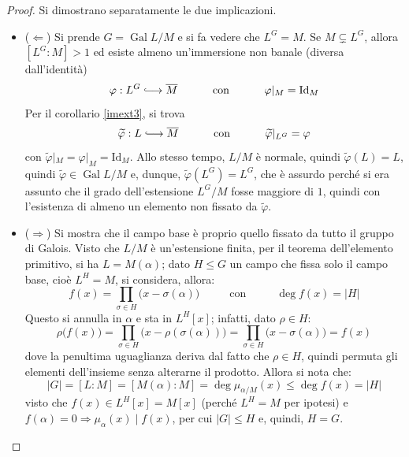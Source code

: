 \documentclass[12pt]{scrartcl}
\theoremstyle{style}
\numberwithin{equation}{subsection}
\newcommand{\longhookrightarrow}{\lhook\joinrel\longrightarrow}
\begin{document}
\begin{proof}
	Si dimostrano separatamente le due implicazioni.
	\begin{itemize}
		\item ($\Leftarrow$) Si prende $G = \operatorname{Gal} L / M$ e si fa vedere che $L^G = M$.
			Se $M \subsetneq L^G$, allora $[L^G:M] > 1$ ed esiste almeno un'immersione non banale (diversa dall'identit\`a)
			\[
			\varphi :L^G \longhookrightarrow \overline{M} \hspace{1cm} \text{ con }\hspace{1cm} \varphi |_M = \mathrm{Id} _M
			\] 
			Per il corollario \ref{imext3}, si trova
			\[
			\widetilde{\varphi }:L\longhookrightarrow \overline{M}\hspace{1cm} \text{ con }\hspace{1cm} \widetilde{\varphi }|_{L^G} =\varphi 
			\] 
			con $\widetilde{\varphi }|_M = \varphi |_M = \mathrm{Id} _M$.
			Allo stesso tempo, $L / M$ \`e normale, quindi $\widetilde{\varphi} (L) = L$, quindi $\widetilde{\varphi }\in \operatorname{Gal} L / M$ e, dunque, $\widetilde{\varphi }(L^G) = L^G$, che \`e assurdo perch\'e si era assunto che il grado dell'estensione $L^G / M$ fosse maggiore di $1$, quindi con l'esistenza di almeno un elemento non fissato da $\widetilde{\varphi }$.
		\item ($\Rightarrow $) Si mostra che il campo base \`e proprio quello fissato da tutto il gruppo di Galois.
			Visto che $L / M$ \`e un'estensione finita, per il teorema dell'elemento primitivo, si ha $L = M(\alpha )$; dato $H\le G$ un campo che fissa solo il campo base, cio\`e $L^H = M$, si considera, allora:
			\[
			f(x) = \prod_{\sigma \in H} \big(x - \sigma (\alpha )\big) \hspace{1cm}\text{ con } \hspace{1cm} \deg f(x) = \lvert H \rvert 
			\] 
			Questo si annulla in $\alpha $ e sta in $L^H[x]$; infatti, dato $\rho \in H$:
			\[
			\rho \big(f(x)\big) = \prod _{\sigma \in H}  \big(x - \rho (\sigma (\alpha ))\big) = \prod_{\sigma \in H} \big(x - \sigma (\alpha )\big) = f(x)
			\] 
			dove la penultima uguaglianza deriva dal fatto che $\rho \in H$, quindi permuta gli elementi dell'insieme senza alterarne il prodotto.
			Allora si nota che:
			\[
				\lvert G \rvert =[L:M] = [M(\alpha ):M] = \deg \mu_{ \alpha  / M} (x) \le \deg f(x) = \lvert H \rvert 
			\] 
			visto che $f(x)\in L^H[x] =M[x]$ (perch\'e $L^H = M$ per ipotesi) e $f(\alpha ) = 0 \Rightarrow  \mu _\alpha (x)  \mid f(x)$, per cui $\lvert G  \rvert \le H$ e, quindi, $H = G$.
	\end{itemize}
\end{proof}
\end{document}
